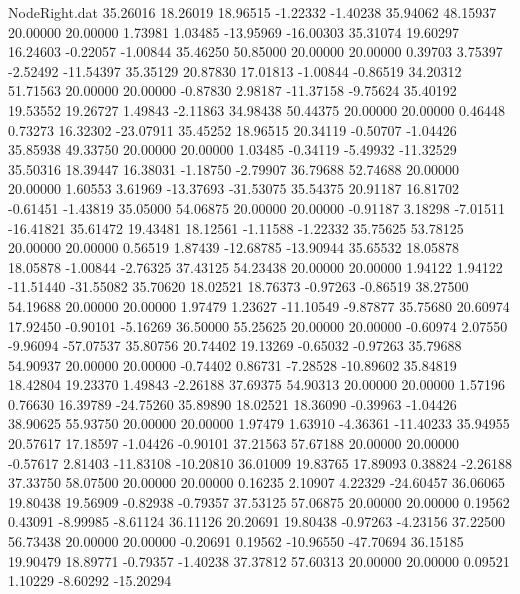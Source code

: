\begin{filecontents}{NodeRight.dat}
  35.26016   18.26019   18.96515    -1.22332   -1.40238   35.94062   48.15937   20.00000   20.00000    1.73981    1.03485  -13.95969  -16.00303
  35.31074   19.60297   16.24603    -0.22057   -1.00844   35.46250   50.85000   20.00000   20.00000    0.39703    3.75397   -2.52492  -11.54397
  35.35129   20.87830   17.01813    -1.00844   -0.86519   34.20312   51.71563   20.00000   20.00000   -0.87830    2.98187  -11.37158   -9.75624
  35.40192   19.53552   19.26727     1.49843   -2.11863   34.98438   50.44375   20.00000   20.00000    0.46448    0.73273   16.32302  -23.07911
  35.45252   18.96515   20.34119    -0.50707   -1.04426   35.85938   49.33750   20.00000   20.00000    1.03485   -0.34119   -5.49932  -11.32529
  35.50316   18.39447   16.38031    -1.18750   -2.79907   36.79688   52.74688   20.00000   20.00000    1.60553    3.61969  -13.37693  -31.53075
  35.54375   20.91187   16.81702    -0.61451   -1.43819   35.05000   54.06875   20.00000   20.00000   -0.91187    3.18298   -7.01511  -16.41821
  35.61472   19.43481   18.12561    -1.11588   -1.22332   35.75625   53.78125   20.00000   20.00000    0.56519    1.87439  -12.68785  -13.90944
  35.65532   18.05878   18.05878    -1.00844   -2.76325   37.43125   54.23438   20.00000   20.00000    1.94122    1.94122  -11.51440  -31.55082
  35.70620   18.02521   18.76373    -0.97263   -0.86519   38.27500   54.19688   20.00000   20.00000    1.97479    1.23627  -11.10549   -9.87877
  35.75680   20.60974   17.92450    -0.90101   -5.16269   36.50000   55.25625   20.00000   20.00000   -0.60974    2.07550   -9.96094  -57.07537
  35.80756   20.74402   19.13269    -0.65032   -0.97263   35.79688   54.90937   20.00000   20.00000   -0.74402    0.86731   -7.28528  -10.89602
  35.84819   18.42804   19.23370     1.49843   -2.26188   37.69375   54.90313   20.00000   20.00000    1.57196    0.76630   16.39789  -24.75260
  35.89890   18.02521   18.36090    -0.39963   -1.04426   38.90625   55.93750   20.00000   20.00000    1.97479    1.63910   -4.36361  -11.40233
  35.94955   20.57617   17.18597    -1.04426   -0.90101   37.21563   57.67188   20.00000   20.00000   -0.57617    2.81403  -11.83108  -10.20810
  36.01009   19.83765   17.89093     0.38824   -2.26188   37.33750   58.07500   20.00000   20.00000    0.16235    2.10907    4.22329  -24.60457
  36.06065   19.80438   19.56909    -0.82938   -0.79357   37.53125   57.06875   20.00000   20.00000    0.19562    0.43091   -8.99985   -8.61124
  36.11126   20.20691   19.80438    -0.97263   -4.23156   37.22500   56.73438   20.00000   20.00000   -0.20691    0.19562  -10.96550  -47.70694
  36.15185   19.90479   18.89771    -0.79357   -1.40238   37.37812   57.60313   20.00000   20.00000    0.09521    1.10229   -8.60292  -15.20294

\end{filecontents}
